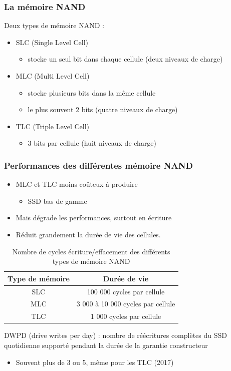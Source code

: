\begin{frame}
\frametitle{La mémoire NAND}
Deux types de mémoire NAND :
\begin{itemize}
\item SLC (Single Level Cell)
\begin{itemize}
\item stocke un seul bit dans chaque cellule (deux niveaux de charge)
\end{itemize}
\item MLC (Multi Level Cell)
\begin{itemize}
\item stocke plusieurs bits dans la même cellule
\item le plus souvent 2 bits (quatre niveaux de charge)
\end{itemize}
\item TLC (Triple Level Cell)
\begin{itemize}
\item 3 bits par cellule (huit niveaux de charge)
\end{itemize}
\end{itemize}
\end{frame}

\begin{frame}
\frametitle{Performances des différentes mémoire NAND}
\begin{itemize}
\item MLC et TLC moins coûteux à produire
\begin{itemize}
\item SSD bas de gamme
\end{itemize}

\item Mais dégrade les performances, surtout en écriture
\item Réduit grandement la durée de vie des cellules.
\end{itemize}

\begin{table}[htdp]
\caption{Nombre de cycles écriture/effacement des différents types de mémoire NAND}
\begin{center}
\begin{tabular}{c|c}
Type de mémoire & Durée de vie \\
\hline
SLC & 100 000 cycles par cellule \\
MLC &  3 000 à 10 000 cycles par cellule \\
TLC & 1 000 cycles par cellule \\
\end{tabular}
\end{center}
\label{}
\end{table}
DWPD (drive writes per day) : nombre de réécritures complètes du SSD quotidienne supporté pendant la durée de la garantie constructeur
\begin{itemize}
  \item Souvent plus de 3 ou 5, même pour les TLC (2017)
\end{itemize}
\end{frame}

